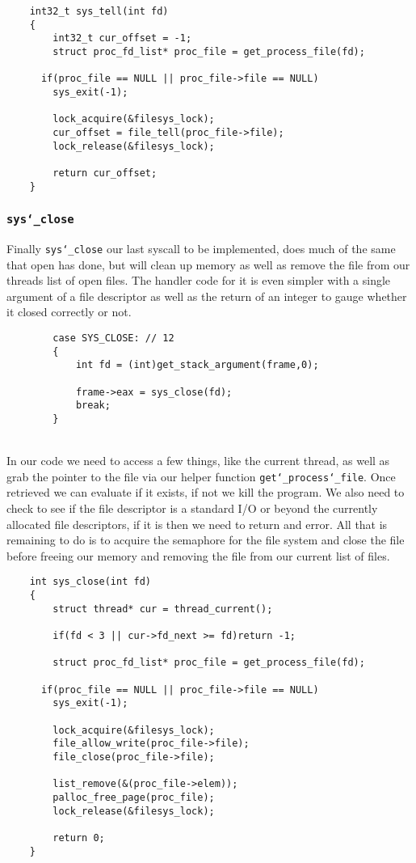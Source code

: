 \documentclass[]{article}
\begin{document}
			\lstset{language=C, tabsize=2}  
		    \begin{lstlisting}   
	int32_t sys_tell(int fd)
	{
		int32_t cur_offset = -1;
		struct proc_fd_list* proc_file = get_process_file(fd);
		
	  if(proc_file == NULL || proc_file->file == NULL)
	  	sys_exit(-1);

		lock_acquire(&filesys_lock);
		cur_offset = file_tell(proc_file->file);
		lock_release(&filesys_lock);
	
		return cur_offset;
	}
		   \end{lstlisting}	  
		   
		   
		   \newpage
  \subsubsection{\texttt{sys\char`_close}}
Finally \texttt{sys\char`_close} our last syscall to be implemented, does much of the same that open has done, but will clean up memory as well as remove the file from our threads list of open files. The handler code for it is even simpler with a single argument of a file descriptor as well as the return of an integer to gauge whether it closed correctly or not.

			\lstset{language=C, tabsize=2}  
		    \begin{lstlisting}   
		case SYS_CLOSE: // 12
		{
			int fd = (int)get_stack_argument(frame,0);
					
			frame->eax = sys_close(fd);
			break;
		}
		   \end{lstlisting}	
		   \texttt{}\\
		In our code we need to access a few things, like the current thread, as well as grab the pointer to the file via our helper function \texttt{get\char`_process\char`_file}. Once retrieved we can evaluate if it exists, if not we kill the program. We also need to check to see if the file descriptor is a standard I/O or beyond the currently allocated file descriptors, if it is then we need to return and error. All that is remaining to do is to acquire the semaphore for the file system and close the file before freeing our memory and removing the file from our current list of files.
  
			\lstset{language=C, tabsize=2}  
		    \begin{lstlisting}   
	int sys_close(int fd)
	{
		struct thread* cur = thread_current();

		if(fd < 3 || cur->fd_next >= fd)return -1;

		struct proc_fd_list* proc_file = get_process_file(fd);
		
	  if(proc_file == NULL || proc_file->file == NULL)
	  	sys_exit(-1);
	
		lock_acquire(&filesys_lock);
		file_allow_write(proc_file->file);
		file_close(proc_file->file);

		list_remove(&(proc_file->elem));
		palloc_free_page(proc_file);
		lock_release(&filesys_lock);
	
		return 0;
	}
		   \end{lstlisting}	  
		   
\end{document}
